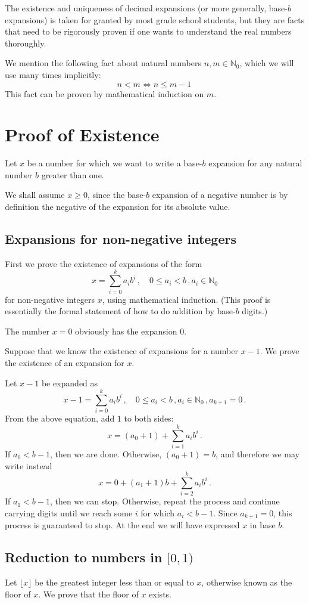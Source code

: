 \documentclass[12pt]{article}
\newcommand{\nat}{\mathbb{N}}
\begin{document}
The existence and uniqueness of decimal expansions 
(or more generally, base-$b$ expansions)
is taken for granted
by most grade school students, 
but they are facts that need to be rigorously proven if one wants to understand 
the real numbers thoroughly. 

We mention the following fact about natural numbers $n,m \in \nat_0$,
which we will use many times implicitly:
\[
n < m \Leftrightarrow n \leq m-1\,
\]
This fact can be proven by mathematical induction on $m$.

\tableofcontents

\section{Proof of Existence}
Let $x$ be a number for which we want to write a base-$b$ expansion
for any natural number $b$ greater than one.

We shall assume $x \geq 0$, since the base-$b$ 
expansion of a negative number is by definition
the negative of the expansion for its absolute value.

\subsection{Expansions for non-negative integers}
First we prove the existence of expansions of the form
\[
x = \sum_{i=0}^k a_i b^i\,, \quad 0 \leq a_i < b\,, a_i \in \nat_0
\]
for non-negative integers $x$,
using mathematical induction.  (This proof is essentially the formal
statement of how to do addition by base-$b$ digits.)

The number $x = 0$ obviously has the expansion $0$.

Suppose that we know the existence of expansions for a number $x-1$.
We prove the existence of an expansion for $x$.

Let $x-1$ be expanded as
\[
x - 1 = \sum_{i=0}^k a_i b^i\,, \quad 0 \leq a_i < b\,, a_i \in \nat_0\,, a_{k+1} = 0\,.
\]
From the above equation, add $1$ to both sides:
\[
x = (a_0+1) + \sum_{i=1}^k a_i b^i \,.
\]
If $a_0 < b-1$, then we are done.  Otherwise,
$(a_0+1) = b$, and therefore we may write instead
\[
x = 0 + (a_1+1) b + \sum_{i=2}^k a_i b^i\,.
\]
If $a_1 < b-1$, then we can stop.  Otherwise,
repeat the process and continue carrying digits
until we reach some $i$ for which $a_i < b-1$.
Since $a_{k+1} = 0$, this process is guaranteed to stop.
At the end we will have expressed $x$ in base $b$.

\subsection{Reduction to numbers in $[0,1)$}
Let $\lfloor x \rfloor$ be the greatest integer less than or equal to $x$,
otherwise known as the floor of $x$.  
We prove that the floor of $x$ exists.
\end{document}
